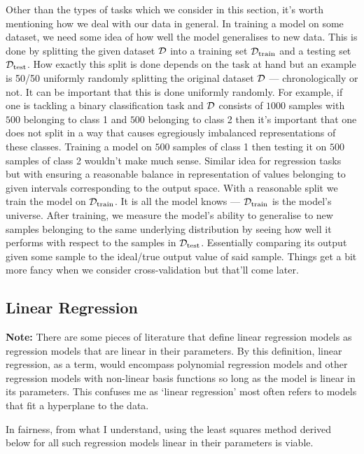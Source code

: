 \documentclass[11pt]{article}
\begin{document}
Other than the types of tasks which we consider in this section, it's worth mentioning how we deal with our data in general. In training a model on some dataset, we need some idea of how well the model generalises to new data. This is done by splitting the given dataset $\mathcal{D}$ into a training set $\mathcal{D}_{\text{train}}$ and a testing set $\mathcal{D}_{\text{test}}$. How exactly this split is done depends on the task at hand but an example is 50/50 uniformly randomly splitting the original dataset $\mathcal{D}$ — chronologically or not. It can be important that this is done uniformly randomly. For example, if one is tackling a binary classification task and $\mathcal{D}$ consists of $1000$ samples with $500$ belonging to class 1 and $500$ belonging to class 2 then it's important that one does not split in a way that causes egregiously imbalanced representations of these classes. Training a model on $500$ samples of class 1 then testing it on $500$ samples of class 2 wouldn't make much sense. Similar idea for regression tasks but with ensuring a reasonable balance in representation of values belonging to given intervals corresponding to the output space. With a reasonable split we train the model on $\mathcal{D}_{\text{train}}$. It is all the model knows — $\mathcal{D}_{\text{train}}$ is the model's universe. After training, we measure the model's ability to generalise to new samples belonging to the same underlying distribution by seeing how well it performs with respect to the samples in $\mathcal{D}_{\text{test}}$. Essentially comparing its output given some sample to the ideal/true output value of said sample. Things get a bit more fancy when we consider cross-validation but that'll come later.

\subsection{Linear Regression}

\textbf{Note:} There are some pieces of literature that define linear regression models as regression models that are linear in their parameters. By this definition, linear regression, as a term, would encompass polynomial regression models and other regression models with non-linear basis functions so long as the model is linear in its parameters. This confuses me as `linear regression' most often refers to models that fit a hyperplane to the data.

In fairness, from what I understand, using the least squares method derived below for all such regression models linear in their parameters is viable.\\
\end{document}
